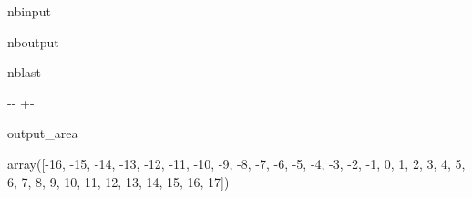 \documentclass[letterpaper,10pt,english]{sphinxmanual}
\newlength\nbsphinxcodecellspacing
\begin{document}
\begin{sphinxuseclass}{nbinput}
{
\begin{sphinxVerbatim}[commandchars=\\\{\}]
\llap{\color{nbsphinxin}[47]:\,\hspace{\fboxrule}\hspace{\fboxsep}}  \PYG{p}{[}\PYG{p}{]} \PYG{p}{[}\PYG{p}{]}  
\end{sphinxVerbatim}
}

\end{sphinxuseclass}
\begin{sphinxuseclass}{nboutput}
\begin{sphinxuseclass}{nblast}
{

\kern-\sphinxverbatimsmallskipamount\kern-\baselineskip
\kern+\FrameHeightAdjust\kern-\fboxrule
\vspace{\nbsphinxcodecellspacing}

\begin{sphinxuseclass}{output_area}
\begin{sphinxuseclass}{}


\begin{sphinxVerbatim}[commandchars=\\\{\}]
\llap{\color{nbsphinxout}[47]:\,\hspace{\fboxrule}\hspace{\fboxsep}}array([-16, -15, -14, -13, -12, -11, -10,  -9,  -8,  -7,  -6,  -5,  -4,
        -3,  -2,  -1,   0,   1,   2,   3,   4,   5,   6,   7,   8,   9,
        10,  11,  12,  13,  14,  15,  16,  17])
\end{sphinxVerbatim}



\end{sphinxuseclass}
\end{sphinxuseclass}
}

\end{sphinxuseclass}
\end{sphinxuseclass}
\end{document}
